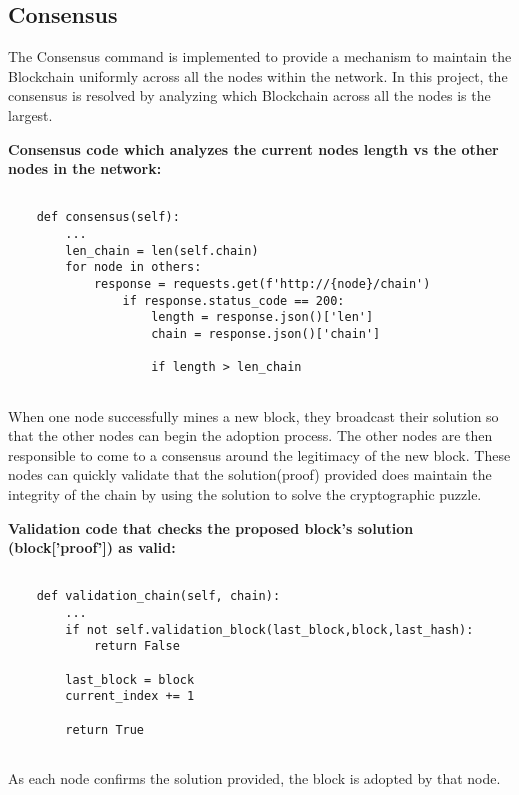 \subsection{Consensus}

The Consensus command is implemented to provide a mechanism to maintain the Blockchain 
uniformly across all the nodes within the network. In this project, the consensus is resolved 
by analyzing which Blockchain across all the nodes is the largest. 

\bigskip
\noindent
\textbf{Consensus code which analyzes the current nodes length vs the other nodes in the
network:}
\begin{footnotesize}
\begin{verbatim}

    def consensus(self):
        ...
        len_chain = len(self.chain)
        for node in others:
            response = requests.get(f'http://{node}/chain')
                if response.status_code == 200:
                    length = response.json()['len']
                    chain = response.json()['chain']

                    if length > len_chain
            
\end{verbatim}
\end{footnotesize}
When one node successfully mines a new block, they broadcast their solution so that the other 
nodes can begin the adoption process. The other nodes are then responsible to come to a 
consensus around the legitimacy of the new block. These nodes can quickly validate that the 
solution(proof) provided does maintain the integrity of the chain by using the solution to 
solve the cryptographic puzzle. 

\bigskip
\noindent
\textbf{Validation code that checks the proposed block's solution
(\textbf{block['proof']}) as valid:}
\begin{footnotesize}
\begin{verbatim}

    def validation_chain(self, chain):
        ...
        if not self.validation_block(last_block,block,last_hash):
            return False

        last_block = block
        current_index += 1

        return True
	
\end{verbatim}
\end{footnotesize}
\bigskip
\noindent
As each node confirms the solution provided, the block is adopted by that node.

